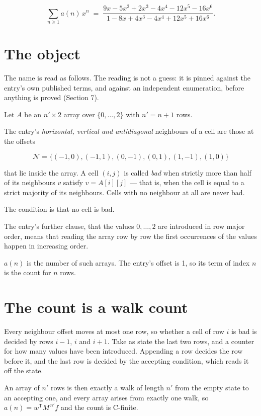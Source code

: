 \documentclass[11pt]{article}
\theoremstyle{definition}
\begin{document}
\[\sum_{n \ge 1} a(n)\,x^n \;=\; \frac{9x - 5x^{2} + 2x^{3} - 4x^{4} - 12x^{5} - 16x^{6}}{1 - 8x + 4x^{3} - 4x^{4} + 12x^{5} + 16x^{6}}.\]

\section{The object}

The name is read as follows. The reading is not a guess: it is pinned against the entry's own published terms, and against an independent enumeration, before anything is proved (Section 7).

Let $A$ be an $n' \times 2$ array over $\{0,\dots,2\}$ with $n' = n + 1$ rows.

The entry's {\itshape horizontal, vertical and antidiagonal} neighbours of a cell are those at the offsets

\[\mathcal{N} = \{(-1,0), (-1,1), (0,-1), (0,1), (1,-1), (1,0)\}\]

that lie inside the array. A cell $(i,j)$ is called {\itshape bad} when strictly more than half of its neighbours $v$ satisfy $v = A[i][j]$ --- that is, when the cell is equal to a strict majority of its neighbours. Cells with no neighbour at all are never bad.

The condition is that no cell is bad.

The entry's further clause, that the values $0,\dots,2$ are introduced in row major order, means that reading the array row by row the first occurrences of the values happen in increasing order.

$a(n)$ is the number of such arrays. The entry's offset is 1, so its term of index $n$ is the count for $n$ rows.

\section{The count is a walk count}

Every neighbour offset moves at most one row, so whether a cell of row $i$ is bad is decided by rows $i-1$, $i$ and $i+1$. Take as state the last two rows, and a counter for how many values have been introduced. Appending a row decides the row before it, and the last row is decided by the accepting condition, which reads it off the state.

An array of $n'$ rows is then exactly a walk of length $n'$ from the empty state to an accepting one, and every array arises from exactly one walk, so $a(n) = w^{\mathsf T}M^{\,n'}f$ and the count is C-finite.
\end{document}
